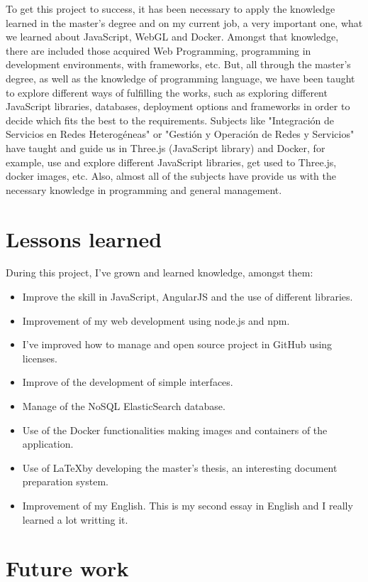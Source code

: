 \documentclass[a4paper, 12pt]{book}
\begin{document}
To get this project to success, it has been necessary to apply the knowledge learned in the master's degree and on my current job, a very important one, what we learned about JavaScript, WebGL and Docker. Amongst that knowledge, there are included those acquired Web Programming, programming in development environments, with frameworks, etc. But, all through the master's degree, as well as the knowledge of programming language, we have been taught to explore different ways of fulfilling the works, such as exploring different JavaScript libraries, databases, deployment options and frameworks in order to decide which fits the best to the requirements.
Subjects like "Integración de Servicios en Redes Heterogéneas" or "Gestión y Operación de Redes y Servicios" have taught and guide us in Three.js (JavaScript library) and Docker, for example, use and explore different JavaScript libraries, get used to Three.js, docker images, etc. Also, almost all of the subjects have provide us with the necessary knowledge in programming and general management.


\section{Lessons learned}
\label{sec:ll}

During this project, I've grown and learned knowledge, amongst them:

\begin{itemize}
\item Improve the skill in JavaScript, AngularJS and the use of different libraries.
\item Improvement of my web development using node.js and npm.
\item I've improved how to manage and open source project in GitHub using licenses.
\item Improve of the development of simple interfaces.
\item Manage of the NoSQL ElasticSearch database.
\item Use of the Docker functionalities making images and containers of the application.
\item Use of \LaTeX  by developing the master's thesis, an interesting document preparation system.
\item Improvement of my English. This is my second essay in English and I really learned a lot writting it.
\end{itemize}

\section{Future work}
\label{sec:fw}
\end{document}
